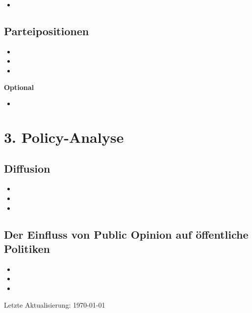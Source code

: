 \documentclass[abstract=on,parskip=full,headings=standardclasses,fontsize=11pt,paper=a4]{scrartcl}
\begin{document}
\begin{itemize}
\item {}
\end{itemize}


\subsection{Parteipositionen}

\begin{itemize}
\item {}
\item {}
\item {}
\end{itemize}



\textbf{Optional}
\begin{itemize}
\item {}
\end{itemize}



\section{3. Policy-Analyse}

\subsection{Diffusion}

\begin{itemize}
\item {}
\item {} 
\item {}
\end{itemize}
 
\subsection{Der Einfluss von Public Opinion auf öffentliche Politiken}

\begin{itemize}
\item {}
\item {}
\item {}
\end{itemize}

\sloppy
\renewcommand*{\bibfont}{\small}

\setlength{\bibitemsep}{0.2em} %
\printbibliography

\bigskip

\begin{center}
Letzte Aktualisierung: \today
\end{center}
\end{document}

